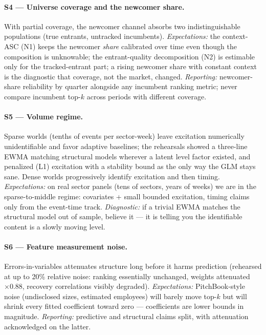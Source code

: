 \paragraph{S4 --- Universe coverage and the newcomer share.}
With partial coverage, the newcomer channel absorbs two indistinguishable
populations (true entrants, untracked incumbents). \emph{Expectations:} the
context-ASC (N1) keeps the newcomer \emph{share} calibrated over time even
though the composition is unknowable; the entrant-quality decomposition (N2) is
estimable only for the tracked-entrant part; a rising newcomer share with
constant context is the diagnostic that coverage, not the market, changed.
\emph{Reporting:} newcomer-share reliability by quarter alongside any
incumbent ranking metric; never compare incumbent top-$k$ across periods with
different coverage.

\paragraph{S5 --- Volume regime.}
Sparse worlds (tenths of events per sector-week) leave excitation numerically
unidentifiable and favor adaptive baselines; the rehearsals showed a
three-line EWMA matching structural models wherever a latent level factor
existed, and penalized (L1) excitation with a stability bound as the only way
the GLM stays sane. Dense worlds progressively identify excitation and then
timing. \emph{Expectations:} on real sector panels (tens of sectors, years of
weeks) we are in the sparse-to-middle regime: covariates + small bounded
excitation, timing claims only from the event-time track.
\emph{Diagnostic:} if a trivial EWMA matches the structural model out of
sample, believe it --- it is telling you the identifiable content is a slowly
moving level.

\paragraph{S6 --- Feature measurement noise.}
Errors-in-variables attenuates structure long before it harms prediction
(rehearsed at up to 20\% relative noise: ranking essentially unchanged,
weights attenuated $\times0.88$, recovery correlations visibly degraded).
\emph{Expectations:} PitchBook-style noise (undisclosed sizes, estimated
employees) will barely move top-$k$ but will shrink every fitted coefficient
toward zero --- coefficients are lower bounds in magnitude.
\emph{Reporting:} predictive and structural claims split, with attenuation
acknowledged on the latter.

